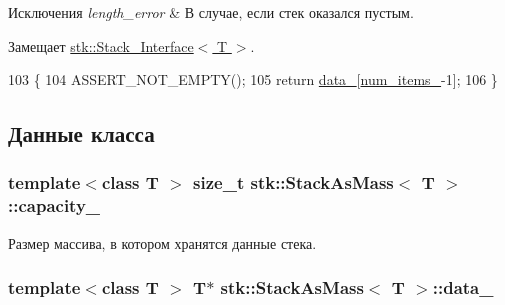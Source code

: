 \begin{DoxyExceptions}{Исключения}
{\em length\+\_\+error} & В случае, если стек оказался пустым. \\
\hline
\end{DoxyExceptions}


Замещает \hyperlink{classstk_1_1_stack___interface_a72962a23863f45a8b2b6905144689681}{stk\+::\+Stack\+\_\+\+Interface$<$ T $>$}.


\begin{DoxyCode}
103                           \{
104         ASSERT\_NOT\_EMPTY();
105         \textcolor{keywordflow}{return} \hyperlink{classstk_1_1_stack_as_mass_a15bf94917c32ed7f450f22de28d14467}{data\_}[\hyperlink{classstk_1_1_stack_as_mass_a5e9451aac734a824c73b3d7054093fef}{num\_items\_}-1];
106     \}
\end{DoxyCode}


\subsection{Данные класса}
\hypertarget{classstk_1_1_stack_as_mass_aa03eca24b4a73e040690da8a14ffef8b}{}
\subsubsection[{capacity\+\_\+}]{\setlength{\rightskip}{0pt plus 5cm}template$<$class T $>$ size\+\_\+t {\bf stk\+::\+Stack\+As\+Mass}$<$ T $>$\+::capacity\+\_\+\hspace{0.3cm}{\ttfamily [private]}}\label{classstk_1_1_stack_as_mass_aa03eca24b4a73e040690da8a14ffef8b}


Размер массива, в котором хранятся данные стека. 

\hypertarget{classstk_1_1_stack_as_mass_a15bf94917c32ed7f450f22de28d14467}{}
\subsubsection[{data\+\_\+}]{\setlength{\rightskip}{0pt plus 5cm}template$<$class T $>$ T$\ast$ {\bf stk\+::\+Stack\+As\+Mass}$<$ T $>$\+::data\+\_\+\hspace{0.3cm}{\ttfamily [private]}}\label{classstk_1_1_stack_as_mass_a15bf94917c32ed7f450f22de28d14467}


